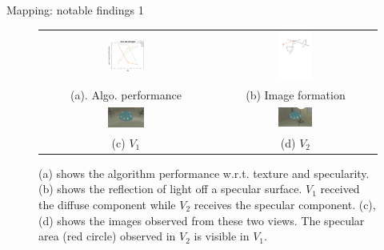 \documentclass[10pt]{beamer}
\begin{document}
\begin{frame}{Mapping: notable findings 1}

\begin{figure}[!htbp]
\begin{tabular}{cc}
\includegraphics[width=0.22\textwidth]{mapping/depend_check/mvs_tex_spec}&
\includegraphics[width=0.22\textwidth]{mapping/mvs_spec/mvs_spec}\\
(a). Algo. performance & (b) Image formation\\
\includegraphics[width=0.22\textwidth]{mapping/mvs_spec/mvs_spec_01}&
\includegraphics[width=0.22\textwidth]{mapping/mvs_spec/mvs_spec_00}\\
(c) $V_1$ & (d) $V_2$\\
\end{tabular}
\caption{(a) shows the algorithm performance w.r.t. texture and specularity. (b) shows the reflection of light off a specular surface. $V_1$ received the diffuse component while $V_2$ receives the specular component. (c), (d) shows the images observed from these two views. The specular area (red circle) observed in $V_2$ is visible in $V_1$.}
\end{figure}

\end{frame}
\end{document}
